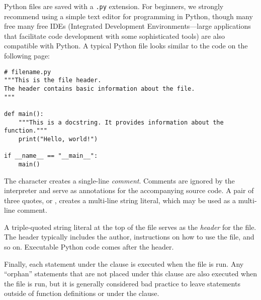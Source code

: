Python files are saved with a \texttt{.py} extension.
For beginners, we strongly recommend using a simple text editor for programming in Python, though many free many free IDEs (Integrated Development Environments---large applications that facilitate code development with some sophisticated tools) are also compatible with Python.
A typical Python file looks similar to the code on the following page:

\begin{lstlisting}
# filename.py
"""This is the file header.
The header contains basic information about the file.
"""

def main():
    """This is a docstring. It provides information about the function."""
    print("Hello, world!")

if __name__ == "__main__":
    main()
\end{lstlisting}

The \li{#} character creates a single-line \emph{comment}.
Comments are ignored by the interpreter and serve as annotations for the accompanying source code.
A pair of three quotes,  or , creates a multi-line string literal, which may be used as a multi-line comment.

A triple-quoted string literal at the top of the file serves as the \emph{header} for the file.
The header typically includes the author, instructions on how to use the file, and so on.
Executable Python code comes after the header.

Finally, each statement under the  clause is executed when the file is run.
Any ``orphan'' statements that are not placed under this clause are also executed when the file is run, but it is generally considered bad practice to leave statements outside of function definitions or under the clause.

